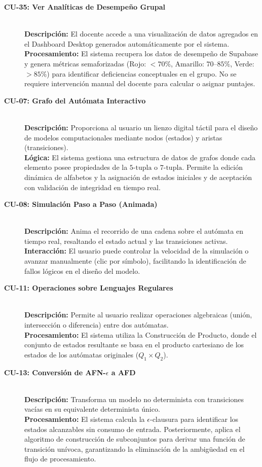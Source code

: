 \begin{description}
    \item[\textbf{CU-35: Ver Analíticas de Desempeño Grupal}]~\\
    \textbf{Descripción:} El docente accede a una visualización de datos agregados en el Dashboard Desktop generados automáticamente por el sistema.\\
    \textbf{Procesamiento:} El sistema recupera los datos de desempeño de Supabase y genera métricas semaforizadas (Rojo: $< 70\%$, Amarillo: $70\text{--}85\%$, Verde: $> 85\%$) para identificar deficiencias conceptuales en el grupo. No se requiere intervención manual del docente para calcular o asignar puntajes.

    \item[\textbf{CU-07: Grafo del Autómata Interactivo}]~\\
    \textbf{Descripción:} Proporciona al usuario un lienzo digital táctil para el diseño de modelos computacionales mediante nodos (estados) y aristas (transiciones).\\
    \textbf{Lógica:} El sistema gestiona una estructura de datos de grafos donde cada elemento posee propiedades de la $5\text{-tupla}$ o $7\text{-tupla}$. Permite la edición dinámica de alfabetos y la asignación de estados iniciales y de aceptación con validación de integridad en tiempo real.

    \item[\textbf{CU-08: Simulación Paso a Paso (Animada)}]~\\
    \textbf{Descripción:} Anima el recorrido de una cadena sobre el autómata en tiempo real, resaltando el estado actual y las transiciones activas.\\
    \textbf{Interacción:} El usuario puede controlar la velocidad de la simulación o avanzar manualmente (clic por símbolo), facilitando la identificación de fallos lógicos en el diseño del modelo.

    \item[\textbf{CU-11: Operaciones sobre Lenguajes Regulares}]~\\
    \textbf{Descripción:} Permite al usuario realizar operaciones algebraicas (unión, intersección o diferencia) entre dos autómatas.\\
    \textbf{Procesamiento:} El sistema utiliza la Construcción de Producto, donde el conjunto de estados resultante se basa en el producto cartesiano de los estados de los autómatas originales ($Q_1 \times Q_2$).

    \item[\textbf{CU-13: Conversión de AFN-$\epsilon$ a AFD}]~\\
    \textbf{Descripción:} Transforma un modelo no determinista con transiciones vacías en su equivalente determinista único.\\
    \textbf{Procesamiento:} El sistema calcula la $\epsilon$-clausura para identificar los estados alcanzables sin consumo de entrada. Posteriormente, aplica el algoritmo de construcción de subconjuntos para derivar una función de transición unívoca, garantizando la eliminación de la ambigüedad en el flujo de procesamiento.


\end{description}

